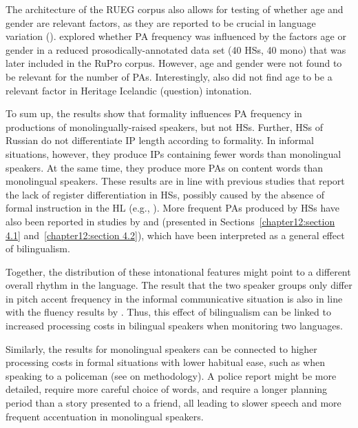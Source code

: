\documentclass[output=paper,colorlinks,citecolor=brown]{langscibook}
\begin{document}
The architecture of the RUEG corpus also allows for testing of whether age and gender are relevant factors, as they are reported to be crucial in language variation (\cite{Tagliamonte_2016, Nagy_2017}). 
\citet{Zuban} explored whether PA frequency was influenced by the factors age or gender in a reduced prosodically-annotated data set (40 HSs, 40 mono) that was later included in the RuPro corpus. However, age and gender were not found to be relevant for the number of PAs. Interestingly, \citet{Dehé_Rommel_forth} also did not find age to be a relevant factor in Heritage Icelandic (question) intonation.

To sum up, the results show that formality influences PA frequency in productions of monolingually-raised speakers, but not HSs. Further, HSs of Russian do not differentiate IP length according to formality. In informal situations, however, they produce IPs containing fewer words than monolingual speakers. At the same time, they produce more PAs on content words than monolingual speakers. These results are in line with previous studies that report the lack of register differentiation in HSs, possibly caused by the absence of formal instruction in the HL (e.g., \cite{Schroeder_etal_forth, Wiese_etal._2022, Alexiadou_Rizou_Karkaletsou_2022, Comstock_2018}). More frequent PAs produced by HSs have also been reported in studies by \citet{Zuban_Rathcke_Zerbian_2023} and \citet{Zerbian_Böttcher_Zuban_2022} (presented in Sections~\ref{chapter12:section 4.1} and~\ref{chapter12:section 4.2}), which have been interpreted as a general effect of bilingualism. 

Together, the distribution of these intonational features might point to a different overall rhythm in the language. The result that the two speaker groups only differ in pitch accent frequency in the informal communicative situation is also in line with the fluency results by \citet{Böttcher_Zellers_subm}. Thus, this effect of bilingualism can be linked to increased processing costs in bilingual speakers when monitoring two languages. 

Similarly, the results for monolingual speakers can be connected to higher processing costs in formal situations with lower habitual ease, such as when speaking to a policeman (see  on methodology). A police report might be more detailed, require more careful choice of words, and require a longer planning period than a story presented to a friend, all leading to slower speech and more frequent accentuation in monolingual speakers. 
\end{document}
